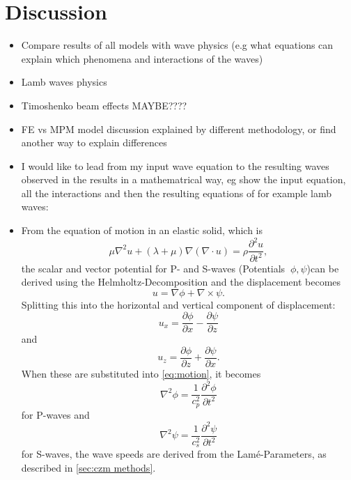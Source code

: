 \documentclass[10pt]{article}
\begin{document}
\section{Discussion}
\begin{itemize}
  \item Compare results of all models with wave physics (e.g what equations can explain which phenomena and interactions of the waves)
  \item Lamb waves physics
  \item Timoshenko beam effects MAYBE????
  \item FE vs MPM model discussion explained by different methodology, or find another way to explain differences
  \item I would like to lead from my input wave equation to the resulting waves observed in the results in a mathematrical way, eg show the input equation, all the interactions and then the resulting equations of for example lamb waves: 
  \item From the equation of motion in an elastic solid, which is \begin{equation}
    \mu \nabla^2 u + (\lambda + \mu) \nabla (\nabla \cdot u) = \rho \frac{\partial^2 u}{\partial t^2}
    \label{eq:motion},
  \end{equation} the scalar and vector potential for P- and S-waves (Potentials $\ \phi, \psi$)can be derived using the Helmholtz-Decomposition and the displacement becomes \begin{equation}
    u = \nabla \phi + \nabla \times \psi. 
  \end{equation} Splitting this into the horizontal and vertical component of displacement: \begin{equation}
    u_x = \frac{\partial \phi}{\partial x} - \frac{\partial \psi}{\partial z}
  \end{equation} and \begin{equation}
    u_z = \frac{\partial\phi}{\partial z} + \frac{\partial \psi}{\partial x}.
  \end{equation} When these are substituted into \ref{eq:motion}, it becomes \begin{equation}
    \nabla^2 \phi = \frac{1}{c_p^2}\frac{\partial^2\phi}{\partial t^2}
  \end{equation} for P-waves and \begin{equation}
    \nabla^2 \psi = \frac{1}{c_s^2} \frac{\partial^2 \psi}{\partial t^2}
  \end{equation} for S-waves, the wave speeds are derived from the Lamé-Parameters, as described in \ref{sec:czm methods}. \par


\end{itemize}
\end{document}
